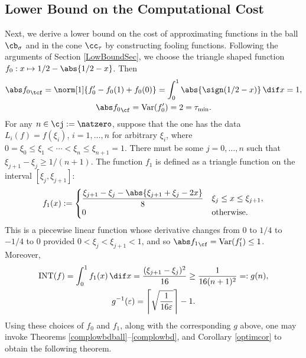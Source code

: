 \subsection{Lower Bound on the Computational Cost}
Next, we derive a lower bound on the cost of approximating functions in the ball $\cb_{\sigma}$ and in the cone $\cc_{\tau}$ by constructing fooling functions. Following the arguments of Section \ref{LowBoundSec}, we choose  the triangle shaped function $f_0: x \mapsto 1/2-\abs{1/2-x}$. Then
\begin{gather*}
\Ftnorm{f_0}=\norm[1]{f'_0-f_0(1)+f_0(0)}=\int_0^1 \abs{\sign(1/2-x)} \, \dif x = 1, \\ \Fnorm{f_0}=\Var(f'_0)=2= \tau_{\min}.
\end{gather*}
For any $n \in \cj:=\natzero$, suppose that the one has the data $L_i(f)=f(\xi_i)$, $i=1, \ldots, n$ for arbitrary $\xi_i$, where $0=\xi_0 \le \xi_1 < \cdots < \xi_n \le \xi_{n+1} = 1$.  There must be some $j=0, \ldots, n$ such that $\xi_{j+1} - \xi_j \ge 1/(n+1)$.  The function $f_{1}$ is defined as a triangle function on the interval $[\xi_j, \xi_{j+1}]$:
$$
f_{1}(x):=\begin{cases} \displaystyle
\frac{\xi_{j+1}-\xi_{j}-\abs{\xi_{j+1}+\xi_{j}-2x}}{8} & \xi_{j} \le x \leq \xi_{j+1},\\
0 & \text{otherwise}.
\end{cases}
$$
This is a piecewise linear function whose derivative changes from $0$ to $1/4$ to $-1/4$ to $0$ provided $0 < \xi_j < \xi_{j+1} < 1$, and so $\Fnorm{f_1}=\Var(f'_1)\le 1$. Moreover,
\begin{gather*}
\INT(f)=\int_0^1 f_1(x) \, \dif x = \frac{(\xi_{j+1} - \xi_j)^2}{16} \ge \frac{1}{16(n+1)^2} =: g(n),\\
g^{-1}(\varepsilon)=\left \lceil \sqrt{\frac{1}{16 \varepsilon}} \right \rceil - 1.
\end{gather*}
Using these choices of $f_0$ and $f_1$, along with the corresponding $g$ above, one may invoke Theorems \ref{complowbdball}--\ref{complowbd}, and Corollary \ref{optimcor} to obtain the following theorem.

